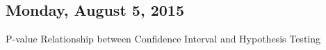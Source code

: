 \subsection{Monday, August 5, 2015}
P-value
Relationship between Confidence Interval and Hypothesis Testing
